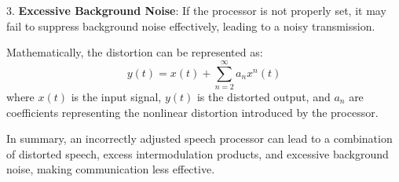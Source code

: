 3. \textbf{Excessive Background Noise}: If the processor is not properly set, it may fail to suppress background noise effectively, leading to a noisy transmission.

Mathematically, the distortion can be represented as:
\[ y(t) = x(t) + \sum_{n=2}^{\infty} a_n x^n(t) \]
where \( x(t) \) is the input signal, \( y(t) \) is the distorted output, and \( a_n \) are coefficients representing the nonlinear distortion introduced by the processor.

In summary, an incorrectly adjusted speech processor can lead to a combination of distorted speech, excess intermodulation products, and excessive background noise, making communication less effective.

